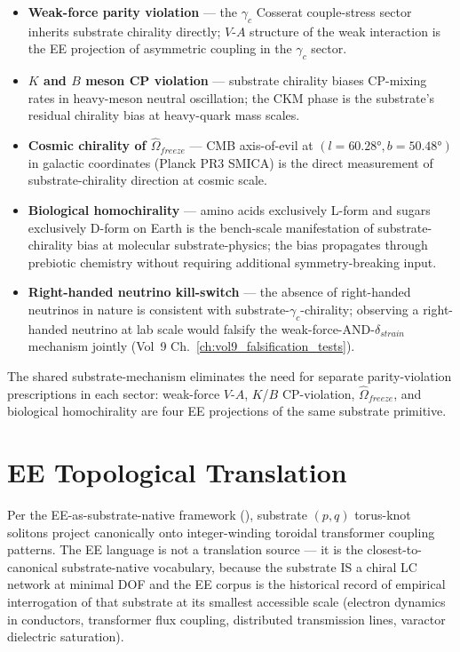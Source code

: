 \begin{itemize}
    \item \textbf{Weak-force parity violation} --- the $\gamma_c$ Cosserat couple-stress sector inherits substrate chirality directly; $V$-$A$ structure of the weak interaction is the EE projection of asymmetric coupling in the $\gamma_c$ sector.
    \item \textbf{$K$ and $B$ meson CP violation} --- substrate chirality biases CP-mixing rates in heavy-meson neutral oscillation; the CKM phase is the substrate's residual chirality bias at heavy-quark mass scales.
    \item \textbf{Cosmic chirality of $\hat{\Omega}_{freeze}$} --- CMB axis-of-evil at $(l = 60.28°, b = 50.48°)$ in galactic coordinates (Planck PR3 SMICA) is the direct measurement of substrate-chirality direction at cosmic scale.
    \item \textbf{Biological homochirality} --- amino acids exclusively L-form and sugars exclusively D-form on Earth is the bench-scale manifestation of substrate-chirality bias at molecular substrate-physics; the bias propagates through prebiotic chemistry without requiring additional symmetry-breaking input.
    \item \textbf{Right-handed neutrino kill-switch} --- the absence of right-handed neutrinos in nature is consistent with substrate-$\gamma_c$-chirality; observing a right-handed neutrino at lab scale would falsify the weak-force-AND-$\delta_{strain}$ mechanism jointly (Vol~9 Ch.~\ref{ch:vol9_falsification_tests}).
\end{itemize}

The shared substrate-mechanism eliminates the need for separate parity-violation prescriptions in each sector: weak-force $V$-$A$, $K$/$B$ CP-violation, $\hat{\Omega}_{freeze}$, and biological homochirality are four EE projections of the same substrate primitive.

\section{EE Topological Translation}
\label{sec:vol9_ee_topological_translation}

Per the EE-as-substrate-native framework (), substrate $(p, q)$ torus-knot solitons project canonically onto integer-winding toroidal transformer coupling patterns. The EE language is not a translation source --- it is the closest-to-canonical substrate-native vocabulary, because the substrate IS a chiral LC network at minimal DOF and the EE corpus is the historical record of empirical interrogation of that substrate at its smallest accessible scale (electron dynamics in conductors, transformer flux coupling, distributed transmission lines, varactor dielectric saturation).

